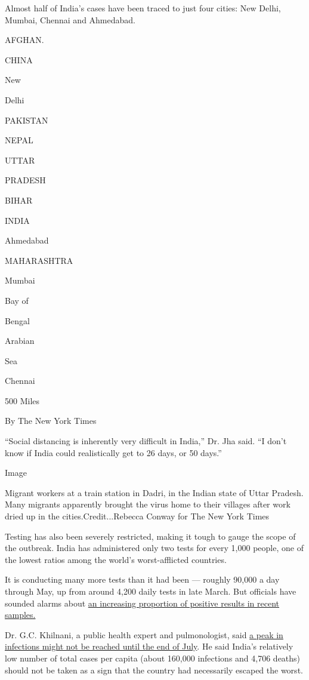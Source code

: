 Almost half of India's cases have been traced to just four cities: New
Delhi, Mumbai, Chennai and Ahmedabad.

AFGHAN.

CHINA

New

Delhi

PAKISTAN

NEPAL

UTTAR

PRADESH

BIHAR

INDIA

Ahmedabad

MAHARASHTRA

Mumbai

Bay of

Bengal

Arabian

Sea

Chennai

500 Miles

By The New York Times

``Social distancing is inherently very difficult in India,'' Dr. Jha
said. ``I don't know if India could realistically get to 26 days, or 50
days.''

Image

Migrant workers at a train station in Dadri, in the Indian state of
Uttar Pradesh. Many migrants apparently brought the virus home to their
villages after work dried up in the cities.Credit...Rebecca Conway for
The New York Times

Testing has also been severely restricted, making it tough to gauge the
scope of the outbreak. India has administered only two tests for every
1,000 people, one of the lowest ratios among the world's worst-afflicted
countries.

It is conducting many more tests than it had been --- roughly 90,000 a
day through May, up from around 4,200 daily tests in late March. But
officials have sounded alarms about
\href{https://indianexpress.com/article/india/last-10-days-positivity-curve-begins-to-steepen-6425753/}{an
increasing proportion of positive results in recent samples.}

Dr. G.C. Khilnani, a public health expert and pulmonologist, said
\href{https://www.ndtv.com/india-news/indias-covid-curve-likely-to-flatten-reach-peak-by-july-end-who-envoy-2225754}{a
peak in infections might not be reached until the end of July}. He said
India's relatively low number of total cases per capita (about 160,000
infections and 4,706 deaths) should not be taken as a sign that the
country had necessarily escaped the worst.

